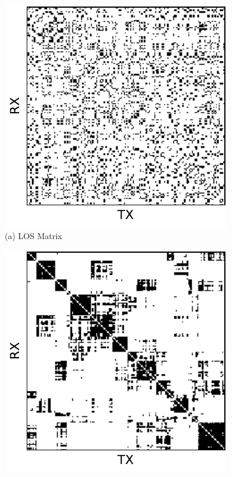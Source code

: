 \documentclass[conference]{IEEEtran}
\begin{document}
\begin{figure}[b!]
  \begin{minipage}[b]{0.32\linewidth}
    \begin{center}
      \includegraphics[width=\textwidth]{images/los_matrix.pdf} \\
      {\footnotesize(a) LOS Matrix}
    \end{center}
  \end{minipage}
  \begin{minipage}[b]{0.32\linewidth}
    \begin{center}
      \includegraphics[width=\textwidth]{images/sorted_matrix.pdf} \\

\end{center}
\end{minipage}
\end{figure}
\end{document}
